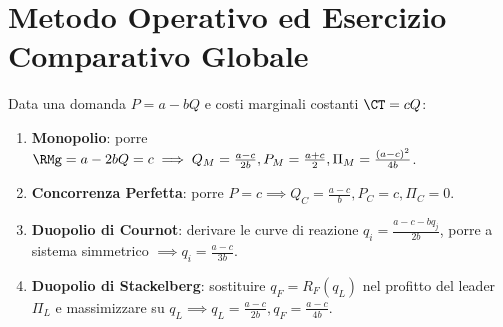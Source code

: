 \section{Metodo Operativo ed Esercizio Comparativo Globale}

\begin{metodo}
Data una domanda $P = a - bQ$ e costi marginali costanti $\CT = cQ$:
\begin{enumerate}
    \item \textbf{Monopolio}: porre $\RMg = a - 2bQ = c \implies Q_M = \frac{a-c}{2b}, P_M = \frac{a+c}{2}, \Pi_M = \frac{(a-c)^2}{4b}$.
    \item \textbf{Concorrenza Perfetta}: porre $P = c \implies Q_C = \frac{a-c}{b}, P_C = c, \Pi_C = 0$.
    \item \textbf{Duopolio di Cournot}: derivare le curve di reazione $q_i = \frac{a-c-bq_j}{2b}$, porre a sistema simmetrico $\implies q_i = \frac{a-c}{3b}$.
    \item \textbf{Duopolio di Stackelberg}: sostituire $q_F = R_F(q_L)$ nel profitto del leader $\Pi_L$ e massimizzare su $q_L \implies q_L = \frac{a-c}{2b}, q_F = \frac{a-c}{4b}$.
\end{enumerate}
\end{metodo}

